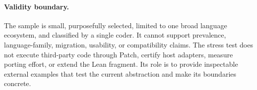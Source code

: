 \paragraph{Validity boundary.}
The sample is small, purposefully selected, limited to one broad language ecosystem, and classified by a single coder. It cannot support prevalence, language-family, migration, usability, or compatibility claims. The stress test does not execute third-party code through Patch, certify host adapters, measure porting effort, or extend the Lean fragment. Its role is to provide inspectable external examples that test the current abstraction and make its boundaries concrete.
